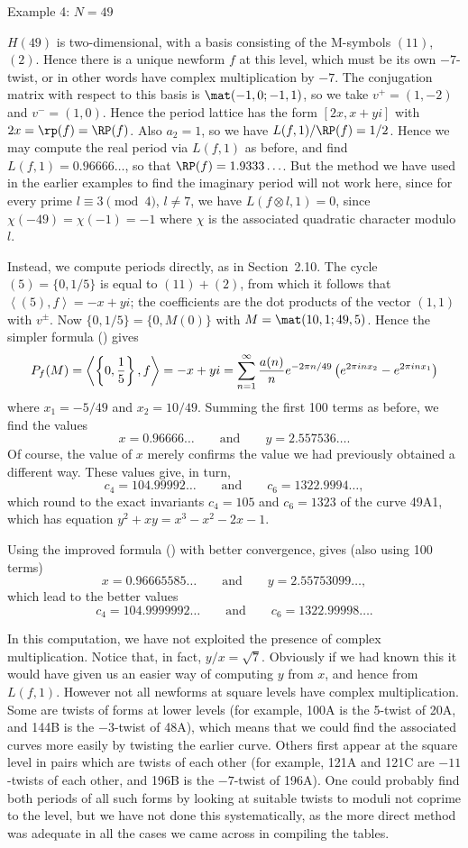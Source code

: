 \head Example 4: $N=49$ \endhead

$H(49)$ is two-dimensional, with a basis consisting of the M-symbols 
$(11)$, $(2)$.  Hence there is a unique newform $f$ at this level, which 
must be its own $-7$-twist, or in other words have complex multiplication by $-7$.  The 
conjugation matrix with respect to this basis is $\mat(-1,0;-1,1)$, so we 
take $v^+=(1,-2)$ and $v^-=(1,0)$.  Hence the period lattice has the form
$[2x,x+yi]$ with $2x=\rp(f)=\RP(f)$.  Also $a_2=1$, so we have
$L(f,1)/\RP(f)=1/2$.  Hence we may compute the real period via $L(f,1)$
as before, and find $L(f,1)=0.96666\ldots$, so that $\RP(f)=1.9333\ldots$.
But the method we have used in the earlier examples to find the imaginary
period will not work here, since for every prime $l\equiv3\pmod4$, 
$l\not=7$, we have $L(f\otimes l,1)=0$, since $\chi(-49)=\chi(-1)=-1$ 
where $\chi$ is the associated quadratic character modulo $l$.

Instead, we compute periods directly, as in Section~2.10.  The
cycle $(5)=\{0,1/5\}$ is equal to $(11)+(2)$, from which it follows
that $\left<(5),f\right>=-x+yi$; the coefficients are the dot products
of the vector $(1,1)$ with $v^{\pm}$.  Now $\{0,1/5\}=\{0,M(0)\}$ with
$M=\mat(10,1;49,5)$.  Hence the simpler formula (\dotseriesoneb) gives
$$
P_f(M) =   \left<\left\{0,\frac15\right\},f\right> = -x+yi = 
\sum_{n=1}^{\infty}\frac{a(n)}{n}e^{-2\pi n/49}\left(e^{2\pi inx_2}-e^{2\pi 
inx_1}\right)
$$
where $x_1=-5/49$ and $x_2=10/49$.  Summing the first 100 terms as 
before, we find the values
$$
  x = 0.96666\ldots \qquad\text{and}\qquad y = 2.557536\ldots.
$$
Of course, the value of $x$ merely confirms the value we had previously 
obtained a different way.  These values give, in turn,
$$
  c_4 = 104.99992\ldots \qquad\text{and}\qquad c_6=1322.9994\ldots,
$$
which round to the exact invariants $c_4=105$ and $c_6=1323$ of the curve
49A1, which has equation $y^2+xy=x^3-x^2-2x-1$.

Using the improved formula (\dotseriestwob) with better convergence,
gives (also using 100 terms)
$$
  x = 0.96665585\ldots \qquad\text{and}\qquad y = 2.55753099\ldots,
$$
which lead to the better values
$$
  c_4 = 104.9999992\ldots \qquad\text{and}\qquad c_6=1322.99998\ldots.
$$

In this computation, we have not exploited the presence of complex
multiplication.  Notice that, in fact, $y/x=\sqrt{7}$.  Obviously if
we had known this it would have given us an easier way of computing
$y$ from $x$, and hence from $L(f,1)$. However not all newforms at
square levels have complex multiplication.  Some are twists of forms
at lower levels (for example, 100A is the 5-twist of 20A, and 144B is
the $-3$-twist of 48A), which means that we could find the associated
curves more easily by twisting the earlier curve.  Others first appear
at the square level in pairs which are twists of each other (for
example, 121A and 121C are $-11$-twists of each other, and 196B is the
$-7$-twist of 196A).  One could probably find both periods of all such
forms by looking at suitable twists to moduli not coprime to the
level, but we have not done this systematically, as the more direct
method was adequate in all the cases we came across in compiling the
tables.

